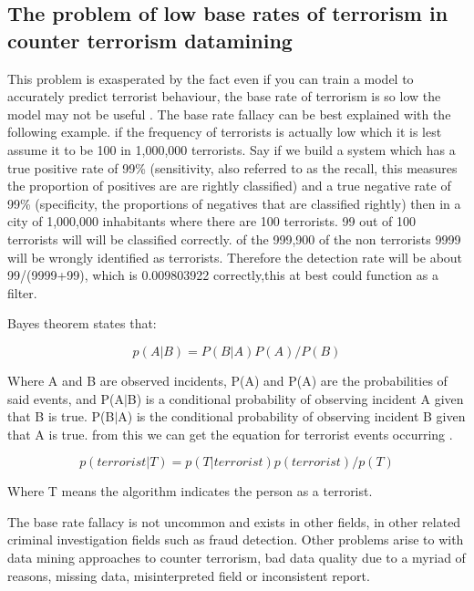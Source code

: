 \subsection{The problem of low base rates of terrorism in counter terrorism datamining}
This problem is exasperated by the fact even if you can train a model to accurately predict terrorist behaviour, the base rate of terrorism is so low the model may not be useful \citep{jensen2003information}. The base rate fallacy can be best explained with the following example. if the frequency of terrorists is actually low which it is lest assume it to be 100 in 1,000,000 terrorists. Say if we build a system which has a true positive rate of 99\% (sensitivity, also referred to as the recall, this measures the proportion of positives are are rightly classified) and a true negative rate of 99\% (specificity, the proportions of negatives that are classified rightly) then in a city of 1,000,000 inhabitants where there are 100 terrorists. 99 out of 100 terrorists will will be classified correctly. of the 999,900 of the non terrorists 9999 will be wrongly identified as terrorists. Therefore the detection rate will be about 99/(9999+99), which is  0.009803922 correctly,this at best could function as a filter. 

Bayes theorem states that:

\begin{equation} p(A|B)=P(B|A)P(A)/P(B) \label{eq1bayes}  \end{equation}

Where A and B are observed incidents, P(A) and P(A) are the probabilities of said events, and P(A$\vert$B) is a conditional probability of observing incident A given that B is true. P(B$\vert$A) is the conditional probability of observing incident B given that A is true. from this we can get the equation for terrorist events occurring  \label{eq2bayes}.
 
\begin{equation} p(terrorist|T)=p(T|terrorist)p(terrorist)/p(T) \label{eq2bayes}  \end{equation}

Where T means the algorithm indicates the person as a terrorist.

The base rate fallacy is not uncommon and exists in other fields, in other related criminal investigation fields such as fraud detection. Other problems arise to with data mining approaches to counter terrorism, bad data quality due to a myriad of reasons, missing data, misinterpreted field or inconsistent report. 

